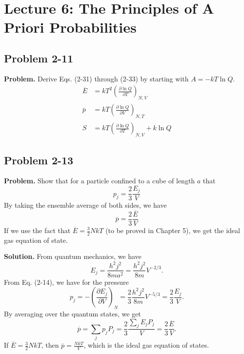 \documentclass[twocolumn, 10pt]{article}
\numberwithin{equation}{section}
\newenvironment{problem}
{\par\medskip\sffamily \color{problue}
  \textbf{Problem. }\ignorespaces}
{\medskip}
\newenvironment{solution}
{\par\medskip
  \textbf{Solution. }\ignorespaces}
{\medskip}
\begin{document}
\section{Lecture 6: The Principles of A Priori Probabilities}

\subsection{Problem 2-11}

\begin{problem}
  Derive Eqs. (2-31) through (2-33)
  by starting with $A = -kT\ln Q$.
  \begin{align*}
    \overline E
    &=
    kT^2 \left(
      \frac{ \partial \ln Q }
           { \partial T }
    \right)_{N, V}
    \tag{2-31}
    \\
    \overline p
    &=
    kT \left(
      \frac{ \partial \ln Q }
           { \partial V }
    \right)_{N, T}
    \tag{2-32}
    \\
    S
    &=
    kT \left(
      \frac{ \partial \ln Q }
           { \partial T }
    \right)_{N, V}
    + k \ln Q
    \tag{2-33}
  \end{align*}
\end{problem}

\subsection{Problem 2-13}

\begin{problem}
  Show that for a particle confined to a cube of length $a$ that
  $$
  p_j = \frac 2 3 \frac{ E_j } { V }
  $$
  By taking the ensemble average of both sides, we have
  $$
  \overline p = \frac 2 3 \frac{ \overline E } { V }
  $$
  If we use the fact that $\overline E = \frac 3 2 N k T$
  (to be proved in Chapter 5),
  we get the ideal gas equation of state.
\end{problem}

\begin{solution}
From quantum mechanics, we have
$$
E_j = \frac{ h^2 j^2 } { 8 m a^2 }
  =
  \frac{ h^2 j^2 } { 8 m } V^{-2/3}.
$$
From Eq. (2-14), we have for the pressure
$$
p_j = -\left( \frac{ \partial E_j } { \partial V } \right)_N
= \frac{2}{3} \frac{ h^2 j^2 } { 8 m } V^{-5/3}
= \frac{2}{3} \frac{ E_j } { V }.
$$
By averaging over the quantum states, we get
$$
  \overline p = \sum_j p_j P_j
  =
  \frac{2}{3} \frac{ \sum_j E_j P_j } { V}
  =
  \frac{2}{3} \frac{ \overline E } { V}.
$$
If $\overline E = \frac{3}{2} N k T$,
then $\overline p = \frac{ N k T } { V}$,
which is the ideal gas equation of states.
\end{solution}
\end{document}
